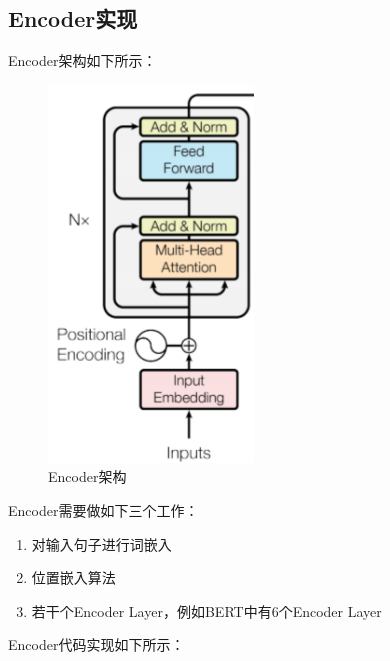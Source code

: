 \documentclass{article}
\begin{document}
\subsection{Encoder实现}
Encoder架构如下所示：
\begin{figure}[H]
    \caption{Encoder架构}
    \label{f000084}
    \centering
    \includegraphics[height=10cm]{images/f000084}
\end{figure}
Encoder需要做如下三个工作：
\begin{enumerate}
\item 对输入句子进行词嵌入
\item 位置嵌入算法
\item 若干个Encoder Layer，例如BERT中有6个Encoder Layer
\end{enumerate}
Encoder代码实现如下所示：
\end{document}

